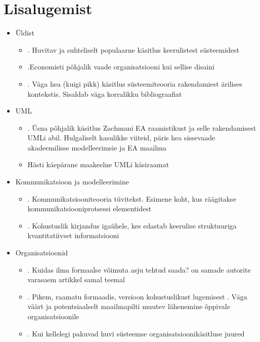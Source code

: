 \documentclass[nobib]{tufte-handout}
\begin{document}
\section{Lisalugemist}
\begin{itemize}
	\item Üldist
	\begin{itemize}	
		\item \cite{simon1996sciences}. Huvitav ja suhteliselt populaarne käsitlus keerulistest süsteemidest 
		\item \cite{stanford2005guide}.Economisti põhjalik vaade organisatsiooni kui sellise disaini
		\item \cite{checkland2000soft}. Väga hea (kuigi pikk) käsitlus süsteemiteooria rakendamiest ärilises kontekstis. Sisaldab väga korralikku bibliograafiat
	\end{itemize}
	\item UML
	\begin{itemize}
		\item \cite{fatolahi2006investigation}. Üsna põhjalik käsitlus Zachmani EA raamistikust ja selle rakendamisest UMLi abil. Hulgaliselt kasulikke viiteid, päris hea sissevaade akadeemilisse modelleerimsie ja EA maailma
		\item \cite{umldistilled} Hästi käepärane maakeelne UMLi käsiraamat
	\end{itemize}
	\item Kommunikatsioon ja modelleerimine
	\begin{itemize}
		\item \cite{shannon2001mathematical}. Kommunikatsiooniteooria tüvitekst. Esimene koht, kus räägitakse kommunikatsiooniprotsessi elementidest
		\item \cite{tufte}. Kohustuslik kirjandus igaühele, kes edastab keerulise struktuuriga kvantitatiivset informatsiooni
	\end{itemize}
	\item Organisatsioonid
	\begin{itemize}
		\item \cite{cohen2007influence}. Kuidas ilma formaalse võimuta asju tehtud saada? \cite{cohen1989influence} on samade autorite varasaem artikkel samal teemal
		\item \cite{senge2006fifth}. Pikem, raamatu formaadis, versioon kohustuslikust lugemisest \cite{senge2002leader}. Väga väärt ja potentsiaalselt maailmapilti muutev lähenemine õppivale organisatsioonile
		\item \cite{optner}. Kui kellelegi pakuvad huvi süsteemse organisatsioonikäsitluse juured
	\end{itemize}
\end{itemize}



\end{document}
